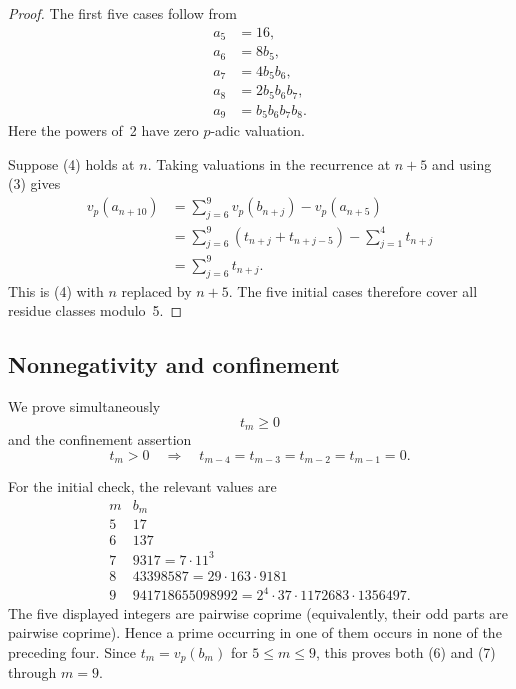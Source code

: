 \documentclass[11pt]{article}
\theoremstyle{remark}
\newcommand{\vp}{v_p}
\begin{document}
\begin{proof}
The first five cases follow from
\[
\begin{aligned}
 a_5&=16,\\
 a_6&=8b_5,\\
 a_7&=4b_5b_6,\\
 a_8&=2b_5b_6b_7,\\
 a_9&=b_5b_6b_7b_8.
\end{aligned}                                                    \tag{5}
\]
Here the powers of~2 have zero $p$-adic valuation.

Suppose (4) holds at $n$.  Taking valuations in the recurrence at $n+5$
and using (3) gives
\[
\begin{aligned}
 \vp(a_{n+10})
 &=\sum_{j=6}^{9}\vp(b_{n+j})-\vp(a_{n+5})\\
 &=\sum_{j=6}^{9}(t_{n+j}+t_{n+j-5})
   -\sum_{j=1}^{4}t_{n+j}\\
 &=\sum_{j=6}^{9}t_{n+j}.
\end{aligned}
\]
This is (4) with $n$ replaced by $n+5$.  The five initial cases therefore
cover all residue classes modulo~5.
\end{proof}

\subsection{Nonnegativity and confinement}

We prove simultaneously
\[
 t_m\geq0                                                        \tag{6}
\]
and the confinement assertion
\[
 t_m>0\quad\Longrightarrow\quad
 t_{m-4}=t_{m-3}=t_{m-2}=t_{m-1}=0.                             \tag{7}
\]

For the initial check, the relevant values are
\[
\begin{array}{c|l}
m&b_m\\ \hline
5&17\\
6&137\\
7&9317=7\cdot11^3\\
8&43398587=29\cdot163\cdot9181\\
9&941718655098992=2^4\cdot37\cdot1172683\cdot1356497.
\end{array}                                                       \tag{8}
\]
The five displayed integers are pairwise coprime (equivalently, their odd
parts are pairwise coprime).  Hence a prime occurring in one of them occurs
in none of the preceding four.  Since $t_m=\vp(b_m)$ for $5\leq m\leq9$,
this proves both (6) and (7) through $m=9$.
\end{document}
